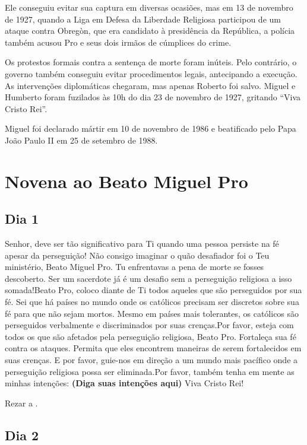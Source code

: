 \documentclass[a4paper,14pt,twoside]{extarticle} \usepackage[utf8]{inputenc}
\begin{document}
Ele conseguiu evitar sua captura em diversas ocasiões, mas em 13 de novembro de
1927, quando a Liga em Defesa da Liberdade Religiosa participou de um ataque
contra Obregòn, que era candidato à presidência da República, a polícia também
acusou Pro e seus dois irmãos de cúmplices do crime.

Os protestos formais contra a sentença de morte foram inúteis. Pelo contrário,
o governo também conseguiu evitar procedimentos legais, antecipando a execução.
As intervenções diplomáticas chegaram, mas apenas Roberto foi salvo. Miguel e
Humberto foram fuzilados às 10h do dia 23 de novembro de 1927, gritando “Viva
Cristo Rei”.

Miguel foi declarado mártir em 10 de novembro de 1986 e beatificado pelo Papa João Paulo II em 25 de setembro de 1988.

\newpage


\section{Novena ao Beato Miguel Pro}

\subsection{Dia 1}

Senhor, deve ser tão significativo para Ti quando uma pessoa persiste na fé apesar da perseguição! Não consigo imaginar o quão desafiador foi o Teu ministério, Beato Miguel Pro. Tu enfrentavas a pena de morte se fosses descoberto. Ser um sacerdote já é um desafio sem a perseguição religiosa a isso somada!Beato Pro, coloco diante de Ti todos aqueles que são perseguidos por sua fé. Sei que há países no mundo onde os católicos precisam ser discretos sobre sua fé para que não sejam mortos. Mesmo em países mais tolerantes, os católicos são perseguidos verbalmente e discriminados por suas crenças.Por favor, esteja com todos os que são afetados pela perseguição religiosa, Beato Pro. Fortaleça sua fé contra os ataques. Permita que eles encontrem maneiras de serem fortalecidos em suas crenças. E por favor, guie-nos em direção a um mundo mais pacífico onde a perseguição religiosa possa ser eliminada.Por favor, também tenha em mente as minhas intenções: \textbf{(Diga suas intenções aqui)} Viva Cristo Rei!

Rezar a \textbf{}.

\subsection{Dia 2}
\end{document}
